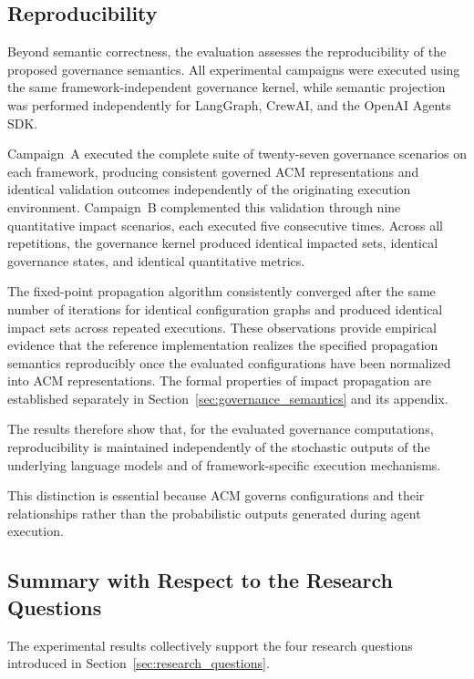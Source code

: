 \documentclass[10pt]{article}
\begin{document}
\subsection{Reproducibility}
\label{subsec:eval-reproducibility}

Beyond semantic correctness, the evaluation assesses the reproducibility of the proposed governance semantics. All experimental campaigns were executed using the same framework-independent governance kernel, while semantic projection was performed independently for LangGraph, CrewAI, and the OpenAI Agents SDK.

Campaign~A executed the complete suite of twenty-seven governance scenarios on each framework, producing consistent governed ACM representations and identical validation outcomes independently of the originating execution environment. Campaign~B complemented this validation through nine quantitative impact scenarios, each executed five consecutive times. Across all repetitions, the governance kernel produced identical impacted sets, identical governance states, and identical quantitative metrics.

The fixed-point propagation algorithm consistently converged after the same number of iterations for identical configuration graphs and produced identical impact sets across repeated executions. These observations provide empirical evidence that the reference implementation realizes the specified propagation semantics reproducibly once the evaluated configurations have been normalized into ACM representations. The formal properties of impact propagation are established separately in Section~\ref{sec:governance_semantics} and its appendix.

The results therefore show that, for the evaluated governance computations, reproducibility is maintained independently of the stochastic outputs of the underlying language models and of framework-specific execution mechanisms.

This distinction is essential because ACM governs configurations and their relationships rather than the probabilistic outputs generated during agent execution.

\subsection{Summary with Respect to the Research Questions}
\label{sec:rq_summary}

The experimental results collectively support the four research questions introduced in Section~\ref{sec:research_questions}.
\end{document}
